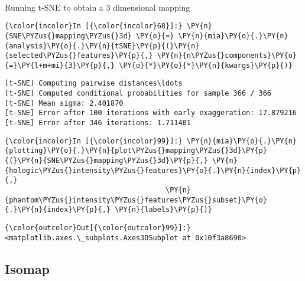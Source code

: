     \begin{center}
    \end{center}
    { \hspace*{\fill} \\}

    Running t-SNE to obtain a 3 dimensional mapping

    \begin{Verbatim}[commandchars=\\\{\}]
{\color{incolor}In [{\color{incolor}68}]:} \PY{n}{SNE\PYZus{}mapping\PYZus{}3d} \PY{o}{=} \PY{n}{mia}\PY{o}{.}\PY{n}{analysis}\PY{o}{.}\PY{n}{tSNE}\PY{p}{(}\PY{n}{selected\PYZus{}features}\PY{p}{,} \PY{n}{n\PYZus{}components}\PY{o}{=}\PY{l+m+mi}{3}\PY{p}{,} \PY{o}{*}\PY{o}{*}\PY{n}{kwargs}\PY{p}{)}
\end{Verbatim}

    \begin{Verbatim}[commandchars=\\\{\}]
[t-SNE] Computing pairwise distances\ldots
[t-SNE] Computed conditional probabilities for sample 366 / 366
[t-SNE] Mean sigma: 2.401870
[t-SNE] Error after 100 iterations with early exaggeration: 17.879216
[t-SNE] Error after 346 iterations: 1.711401
    \end{Verbatim}

    \begin{Verbatim}[commandchars=\\\{\}]
{\color{incolor}In [{\color{incolor}99}]:} \PY{n}{mia}\PY{o}{.}\PY{n}{plotting}\PY{o}{.}\PY{n}{plot\PYZus{}mapping\PYZus{}3d}\PY{p}{(}\PY{n}{SNE\PYZus{}mapping\PYZus{}3d}\PY{p}{,} \PY{n}{hologic\PYZus{}intensity\PYZus{}features}\PY{o}{.}\PY{n}{index}\PY{p}{,}
                                      \PY{n}{phantom\PYZus{}intensity\PYZus{}features\PYZus{}subset}\PY{o}{.}\PY{n}{index}\PY{p}{,} \PY{n}{labels}\PY{p}{)}
\end{Verbatim}

            \begin{Verbatim}[commandchars=\\\{\}]
{\color{outcolor}Out[{\color{outcolor}99}]:} <matplotlib.axes.\_subplots.Axes3DSubplot at 0x10f3a8690>
\end{Verbatim}

    \subsection{Isomap}\label{isomap}

